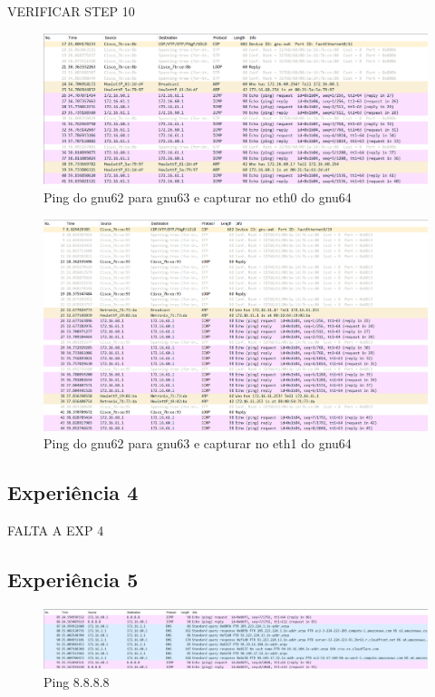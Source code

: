 \documentclass[article, a4paper, 11pt, oneside]{memoir}
\begin{document}
VERIFICAR STEP 10

\newpage
\begin{figure}[h]
	\centering
\includegraphics[scale=0.55]{exp3-step10-ping-gnu62-from-gnu63-eth0.png}
\caption{Ping do gnu62 para gnu63 e capturar no eth0 do gnu64}
\end{figure}

\begin{figure}[h]
	\centering
\includegraphics[scale=0.55]{exp3-step10-ping-gnu62-from-gnu63-eth1.png}
\caption{Ping do gnu62 para gnu63 e capturar no eth1 do gnu64}
\end{figure}

\subsection{Experiência 4}
FALTA A EXP 4

\newpage
\subsection{Experiência 5}
\begin{figure}[h]
	\centering
\includegraphics[scale=0.55]{exp5-step3.png}
\caption{Ping 8.8.8.8}
\end{figure}
\end{document}
